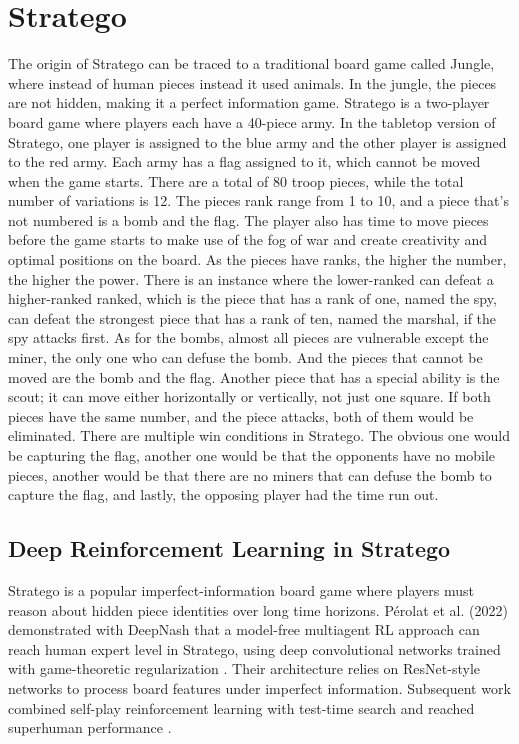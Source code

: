 \section{Stratego}
The origin of Stratego can be traced to a traditional board game called Jungle, where instead of human pieces instead it used animals. In the jungle, the pieces are not hidden, making it a perfect information game. Stratego is a two-player board game where players each have a 40-piece army. In the tabletop version of Stratego, one player is assigned to the blue army and the other player is assigned to the red army. Each army has a flag assigned to it, which cannot be moved when the game starts. There are a total of 80 troop pieces, while the total number of variations is 12. The pieces rank range from 1 to 10, and a piece that's not numbered is a bomb and the flag. The player also has time to move pieces before the game starts to make use of the fog of war and create creativity and optimal positions on the board. As the pieces have ranks, the higher the number, the higher the power. There is an instance where the lower-ranked can defeat a higher-ranked ranked, which is the piece that has a rank of one, named the spy, can defeat the strongest piece that has a rank of ten, named the marshal, if the spy attacks first. As for the bombs, almost all pieces are vulnerable except the miner, the only one who can defuse the bomb. And the pieces that cannot be moved are the bomb and the flag. Another piece that has a special ability is the scout; it can move either horizontally or vertically, not just one square. If both pieces have the same number, and the piece attacks, both of them would be eliminated. There are multiple win conditions in Stratego. The obvious one would be capturing the flag, another one would be that the opponents have no mobile pieces, another would be that there are no miners that can defuse the bomb to capture the flag, and lastly, the opposing player had the time run out.

\subsection{Deep Reinforcement Learning in Stratego}
Stratego is a popular imperfect-information board game where players must reason about hidden piece identities over long time horizons. P\'{e}rolat et al. (2022) demonstrated with DeepNash that a model-free multiagent RL approach can reach human expert level in Stratego, using deep convolutional networks trained with game-theoretic regularization \cite{perolat2022stratego}. Their architecture relies on ResNet-style networks to process board features under imperfect information. Subsequent work combined self-play reinforcement learning with test-time search and reached superhuman performance \cite{Ataraxos2025}.

